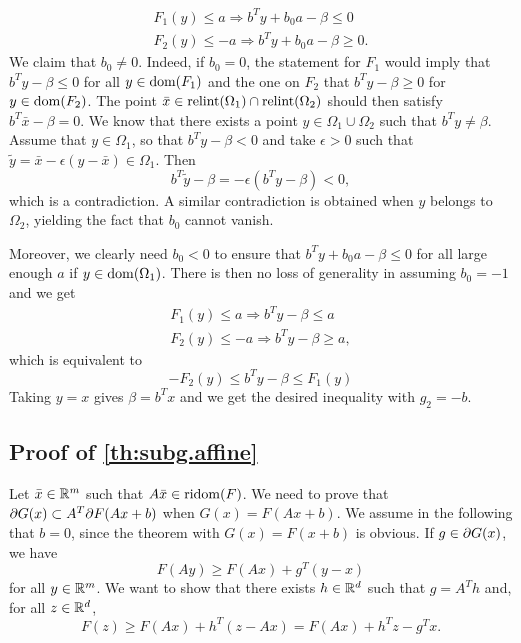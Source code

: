 \begin{align*}
F_1(y)  \leq a \Rightarrow b^Ty + b_0 a -\beta \leq 0 \\
F_2(y)  \leq -a \Rightarrow b^Ty + b_0 a -\beta \geq 0.
\end{align*}
We claim that  $b_0 \neq 0$. Indeed, if $b_0=0$, the statement for $F_1$ would imply  that $b^T y -\beta \leq 0$ for all $y\in \mathrm{dom}(F_1)$ and the one on $F_2$ that $b^Ty - \beta \geq 0$ for $y\in \mathrm{dom}(F_2)$.  The point $\bar x \in \mathrm{relint}(\Omega_1) \cap \mathrm{relint}(\Omega_2)$ should then satisfy $b^T \bar x -\beta = 0$. We know that there exists a point $y\in \Omega_1 \cup \Omega_2$ such that $b^T y\neq \beta$. Assume that $y\in \Omega_1$, so that $b^T y -\beta < 0$ and take $\epsilon >0$ such that $\tilde y = \bar{x} - \epsilon(y-\bar x) \in \Omega_1$. Then 
\[
b^T \tilde y - \beta  = - \epsilon (b^T y - \beta) < 0,
\]
which is a contradiction. A similar contradiction is obtained when $y$ belongs to $\Omega_2$, yielding the fact that $b_0$ cannot vanish.

Moreover, we clearly need $b_0<0$ to ensure that $b^Ty + b_0 a -\beta \leq 0$ for all large enough $a$ if $y\in \mathrm{dom}(\Omega_1)$. There is then no loss of generality in assuming $b_0 = -1$ and we get 
\begin{align*}
F_1(y)  \leq a \Rightarrow b^Ty -\beta \leq a \\
F_2(y) \leq -a \Rightarrow b^Ty -\beta \geq a,
\end{align*}
which is equivalent to 
\[
 - F_2(y) \leq b^Ty -\beta \leq F_1(y)
\]
Taking $y=x$ gives $\beta = b^T x$ and we get the desired inequality with $g_2 = -b$.


\subsection{Proof of \cref{th:subg.affine}}
Let $\bar x\in {\mathbb{R}}^m$ such that $A\bar x\in \mathrm{ridom}(F)$. 
We need to prove that $\partial G(x) \subset A^T \partial F(Ax+b)$ when $G(x) = F(Ax+b)$. We assume in the following that $b=0$, since the theorem with $G(x) = F(x+b)$ is obvious.
If $g\in \partial G(x)$, we have
\[
F(Ay) \geq F(Ax) + g^T(y-x)
\]
for all $y\in {\mathbb{R}}^m$. We want to show that there exists $h\in {\mathbb{R}}^d$ such that $g = A^T h$ and, for all $z\in {\mathbb{R}}^d$,
\[
F(z) \geq F(Ax) + h^T(z- Ax) = F(Ax) + h^T z - g^T x.
\]

